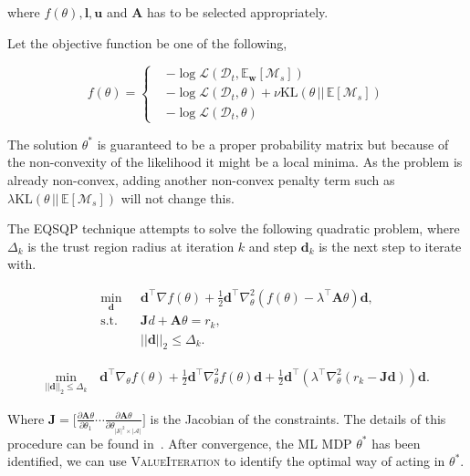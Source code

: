 where $f(\theta), \bm{l}, \bm{u}$ and $\mathbf{A}$ has to be selected appropriately.

Let the objective function be one of the following,

\begin{equation}
    f(\theta) = \begin{cases}
    & -\log \mathcal{L}(\mathcal{D}_t, \mathbb{E}_{\bm{w}}[\mathcal{M}_s])\\
    & -\log \mathcal{L}(\mathcal{D}_t, \theta) + \nu \textrm{KL}(\theta \, || \, \mathbb{E}[\mathcal{M}_s])\\
    & -\log \mathcal{L}(\mathcal{D}_t, \theta)
    \end{cases}
\end{equation}

The solution $\theta^{*}$ is guaranteed to be a proper probability matrix but because of the non-convexity of the likelihood it might be a local minima. As the problem is already non-convex, adding another non-convex penalty term such as $\lambda \textrm{KL}(\theta \, || \, \mathbb{E}[\mathcal{M}_s])$ will not change this.

The \textsc{EQSQP} technique attempts to solve the following quadratic problem, where $\Delta_k$ is the trust region radius at iteration $k$ and step $\bm{d}_k$ is the next step to iterate with.

\begin{equation}
\begin{aligned}
    \underset{\bm{d}}{\min} \, &\bm{d}^\top \nabla f(\theta) + \frac{1}{2} \bm{d}^\top \nabla^2_{\theta} (f(\theta) - \lambda^\top\mathbf{A}\theta)\bm{d},\\
\textrm{s.t.} \quad & \mathbf{J}d + \mathbf{A}\theta =r_k,\\
\quad & ||\bm{d}||_2 \leq \Delta_k.
\end{aligned}
\end{equation}

\begin{equation}
\begin{aligned}
    \underset{||\bm{d}||_2 \leq \Delta_k}{\min} \, &\bm{d}^\top \nabla_{\theta} f(\theta) + \frac{1}{2} \bm{d}^\top \nabla^2_{\theta} f(\theta)\bm{d} + \frac{1}{2}\bm{d}^{\top}(\lambda^\top\nabla^2_{\theta} (r_k - \mathbf{J}\bm{d}))\bm{d}.
\end{aligned}
\end{equation}

Where $\mathbf{J} = \Big[\frac{\partial \mathbf{A}\theta}{\partial \theta_1} \cdots \frac{\partial \mathbf{A}\theta}{\partial \theta_{|\mathcal{S}|^2\times|\mathcal{A}|}}\Big]$ is the Jacobian of the constraints. The details of this procedure can be found in~\cite{byrd1987robust, omojokun1989trust, lalee1998implementation}. After convergence, the ML MDP $\theta^{*}$ has been identified, we can use \textsc{ValueIteration} to identify the optimal way of acting in $\theta^{*}$.

